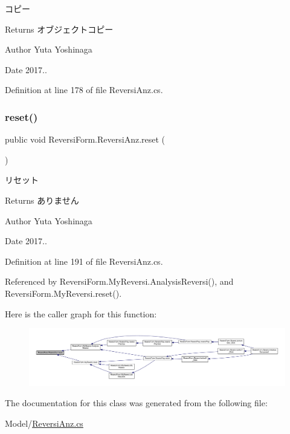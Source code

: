 コピー 

\begin{DoxyReturn}{Returns}
オブジェクトコピー 
\end{DoxyReturn}
\begin{DoxyAuthor}{Author}
Yuta Yoshinaga 
\end{DoxyAuthor}
\begin{DoxyDate}{Date}
2017.. 
\end{DoxyDate}


Definition at line 178 of file Reversi\+Anz.\+cs.

\mbox{\label{class_reversi_form_1_1_reversi_anz_a2428d6f4fd60b95d28876b1f0f8ce151}} 
\subsubsection{\texorpdfstring{reset()}{reset()}}
{\footnotesize\ttfamily public void Reversi\+Form.\+Reversi\+Anz.\+reset (\begin{DoxyParamCaption}{ }\end{DoxyParamCaption})}



リセット 

\begin{DoxyReturn}{Returns}
ありません 
\end{DoxyReturn}
\begin{DoxyAuthor}{Author}
Yuta Yoshinaga 
\end{DoxyAuthor}
\begin{DoxyDate}{Date}
2017.. 
\end{DoxyDate}


Definition at line 191 of file Reversi\+Anz.\+cs.



Referenced by Reversi\+Form.\+My\+Reversi.\+Analysis\+Reversi(), and Reversi\+Form.\+My\+Reversi.\+reset().

Here is the caller graph for this function\+:
\nopagebreak
\begin{figure}[H]
\begin{center}
\leavevmode
\includegraphics[width=350pt]{class_reversi_form_1_1_reversi_anz_a2428d6f4fd60b95d28876b1f0f8ce151_icgraph}
\end{center}
\end{figure}


The documentation for this class was generated from the following file\+:\begin{DoxyCompactItemize}
\item 
Model/\hyperlink{_reversi_anz_8cs}{Reversi\+Anz.\+cs}\end{DoxyCompactItemize}
